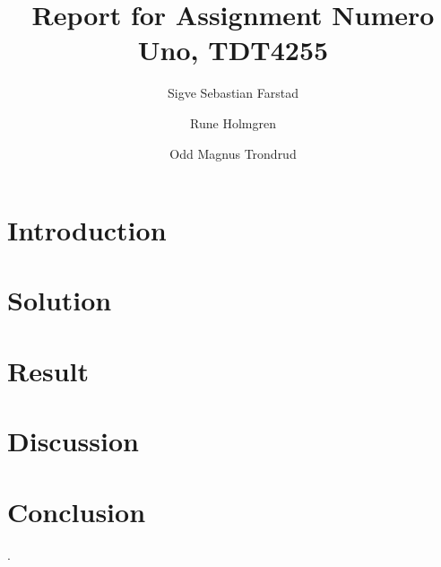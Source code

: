 \documentclass[10pt]{report}
\title{Report for Assignment Numero Uno, TDT4255}
\author{Sigve Sebastian Farstad \and
		Rune Holmgren \and
		Odd Magnus Trondrud}
\begin{document}
\maketitle

\begin{abstract}
	
\end{abstract}

\tableofcontents

\section{Introduction}
	

\section{Solution}
	

\section{Result}
	

\section{Discussion}
	

\section{Conclusion}
	

\cite{compendium}.


{}

\nocite{*} %
\end{document}
